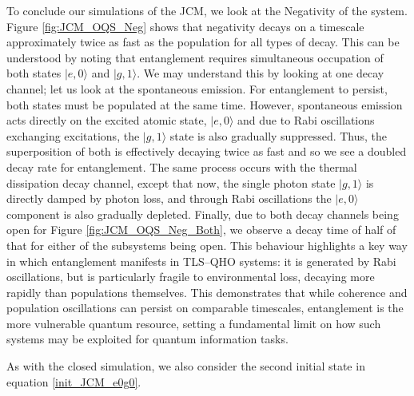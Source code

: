 \documentclass[11pt]{article}
\newcounter{subsubsubsection}[subsubsection]
\begin{document}
\noindent To conclude our simulations of the JCM, we look at the Negativity of the system. Figure \ref{fig:JCM_OQS_Neg} shows that negativity decays on a timescale approximately twice as fast as the population for all types of decay. This can be understood by noting that entanglement requires simultaneous occupation of both states $|e,0\rangle$ and $|g,1\rangle$. We may understand this by looking at one decay channel; let us look at the spontaneous emission. For entanglement to persist, both states must be populated at the same time. However, spontaneous emission acts directly on the excited atomic state, $|e,0\rangle$  and due to Rabi oscillations exchanging excitations, the $|g,1\rangle$ state is also gradually suppressed. Thus, the superposition of both is effectively decaying twice as fast and so we see a doubled decay rate for entanglement. The same process occurs with the thermal dissipation decay channel, except that now, the single photon state $|g,1\rangle$ is directly damped by photon loss, and through Rabi oscillations the $|e,0\rangle$ component is also gradually depleted. Finally, due to both decay channels being open for Figure \ref{fig:JCM_OQS_Neg_Both}, we observe a decay time of half of that for either of the subsystems being open. This behaviour highlights a key way in which entanglement manifests in TLS--QHO systems: it is generated by Rabi oscillations, but is particularly fragile to environmental loss, decaying more rapidly than populations themselves. This demonstrates that while coherence and population oscillations can persist on comparable timescales, entanglement is the more vulnerable quantum resource, setting a fundamental limit on how such systems may be exploited for quantum information tasks.


As with the closed simulation, we also consider the second initial state in equation \eqref{init_JCM_e0g0}.
\end{document}
